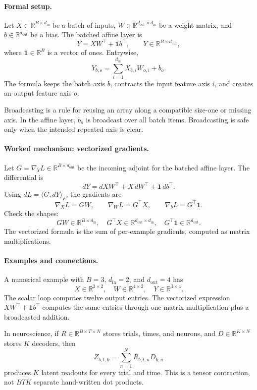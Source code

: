 \paragraph{Formal setup.}
Let \(X\in\mathbb{R}^{B\times d_{\mathrm{in}}}\) be a batch of inputs, \(W\in\mathbb{R}^{d_{\mathrm{out}}\times d_{\mathrm{in}}}\) be a weight matrix, and \(b\in\mathbb{R}^{d_{\mathrm{out}}}\) be a bias. The batched affine layer is
\[
Y=XW^\top+\mathbf{1}b^\top,
\qquad
Y\in\mathbb{R}^{B\times d_{\mathrm{out}}},
\]
where \(\mathbf{1}\in\mathbb{R}^{B}\) is a vector of ones. Entrywise,
\[
Y_{b,o}=\sum_{i=1}^{d_{\mathrm{in}}}X_{b,i}W_{o,i}+b_o.
\]
The formula keeps the batch axis \(b\), contracts the input feature axis \(i\), and creates an output feature axis \(o\).

Broadcasting is a rule for reusing an array along a compatible size-one or missing axis. In the affine layer, \(b_o\) is broadcast over all batch items. Broadcasting is safe only when the intended repeated axis is clear.

\paragraph{Worked mechanism: vectorized gradients.}
Let \(G=\nabla_Y L\in\mathbb{R}^{B\times d_{\mathrm{out}}}\) be the incoming adjoint for the batched affine layer. The differential is
\[
dY=dXW^\top+X\,dW^\top+\mathbf{1}\,db^\top.
\]
Using \(dL=\langle G,dY\rangle_F\), the gradients are
\[
\boxed{\nabla_X L=GW,\qquad \nabla_W L=G^\top X,\qquad \nabla_b L=G^\top\mathbf{1}.}
\]
Check the shapes:
\[
GW\in\mathbb{R}^{B\times d_{\mathrm{in}}},
\quad
G^\top X\in\mathbb{R}^{d_{\mathrm{out}}\times d_{\mathrm{in}}},
\quad
G^\top\mathbf{1}\in\mathbb{R}^{d_{\mathrm{out}}}.
\]
The vectorized formula is the sum of per-example gradients, computed as matrix multiplications.

\paragraph{Examples and connections.}
A numerical example with \(B=3\), \(d_{\mathrm{in}}=2\), and \(d_{\mathrm{out}}=4\) has
\[
X\in\mathbb{R}^{3\times 2},\quad W\in\mathbb{R}^{4\times 2},\quad Y\in\mathbb{R}^{3\times 4}.
\]
The scalar loop computes twelve output entries. The vectorized expression \(XW^\top+\mathbf{1}b^\top\) computes the same entries through one matrix multiplication plus a broadcasted addition.

In neuroscience, if \(R\in\mathbb{R}^{B\times T\times N}\) stores trials, times, and neurons, and \(D\in\mathbb{R}^{K\times N}\) stores \(K\) decoders, then
\[
Z_{b,t,k}=\sum_{n=1}^N R_{b,t,n}D_{k,n}
\]
produces \(K\) latent readouts for every trial and time. This is a tensor contraction, not \(BTK\) separate hand-written dot products.


